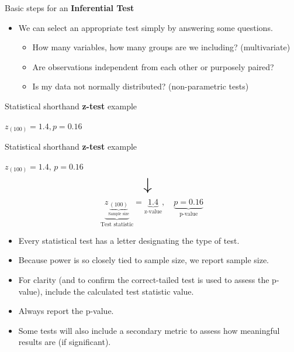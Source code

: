 \documentclass[
  ignorenonframetext,
]{beamer}
\providecommand{\tightlist}{%
  \setlength{\itemsep}{0pt}\setlength{\parskip}{0pt}}
\begin{document}
\begin{frame}{Basic steps for an \textbf{Inferential Test}}
\label{basic-steps-for-an-inferential-test-3}
\begin{itemize}
\item
  We can select an appropriate test simply by answering some questions.

  \begin{itemize}
  \item
    How many variables, how many groups are we including? (multivariate)
  \item
    Are observations independent from each other or purposely paired?
  \item
    Is my data not normally distributed? (non-parametric tests)
  \end{itemize}
\end{itemize}
\end{frame}

\begin{frame}{Statistical shorthand \textbf{z-test} example}
\label{statistical-shorthand-z-test-example}
\centering

\(z_{(100)} = 1.4, p = 0.16\)\\
\end{frame}

\begin{frame}{Statistical shorthand \textbf{z-test} example}
\label{statistical-shorthand-z-test-example-1}
\centering

\(z_{(100)} = 1.4, \, p = 0.16\) \[
\text{\huge $\downarrow$} \quad
\] \centering \[
\underbrace{z_{\underbrace{(100)}_{\text{Sample size}}}}_{\text{Test statistic}} = \underbrace{1.4}_{\text{z-value}}, \quad \underbrace{p = 0.16}_{\text{p-value}}
\]

\begin{itemize}
\tightlist
\item
  Every statistical test has a letter designating the type of test.
\item
  Because power is so closely tied to sample size, we report sample
  size.
\item
  For clarity (and to confirm the correct-tailed test is used to assess
  the p-value), include the calculated test statistic value.
\item
  Always report the p-value.
\item
  Some tests will also include a secondary metric to assess how
  meaningful results are (if significant).
\end{itemize}
\end{frame}
\end{document}
